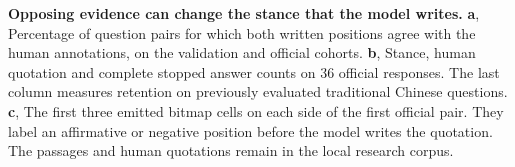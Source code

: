 \textbf{Opposing evidence can change the stance that the model writes.}
\textbf{a}, Percentage of question pairs for which both written positions agree with the human annotations, on the validation and official cohorts. \textbf{b}, Stance, human quotation and complete stopped answer counts on 36 official responses. The last column measures retention on previously evaluated traditional Chinese questions. \textbf{c}, The first three emitted bitmap cells on each side of the first official pair. They label an affirmative or negative position before the model writes the quotation. The passages and human quotations remain in the local research corpus.
